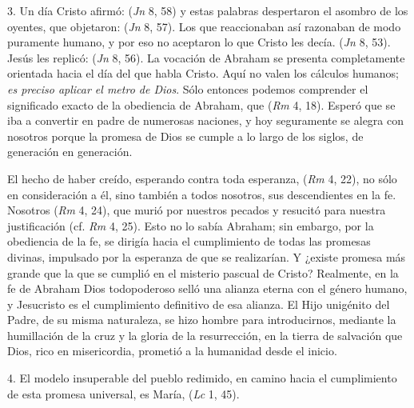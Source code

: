 \begin{body}
3. Un día Cristo afirmó:  (\textit{Jn} 8, 58) y estas palabras despertaron el asombro de los oyentes, que objetaron:  (\textit{Jn} 8, 57). Los que reaccionaban así razonaban de modo puramente humano, y por eso no aceptaron lo que Cristo les decía.  (\textit{Jn} 8, 53). Jesús les replicó:  (\textit{Jn} 8, 56). La vocación de Abraham se presenta completamente orientada hacia el día del que habla Cristo. Aquí no valen los cálculos humanos; \textit{es preciso aplicar el metro de Dios}. Sólo entonces podemos comprender el significado exacto de la obediencia de Abraham, que  (\textit{Rm} 4, 18). Esperó que se iba a convertir en padre de numerosas naciones, y hoy seguramente se alegra con nosotros porque la promesa de Dios se cumple a lo largo de los siglos, de generación en generación.

El hecho de haber creído, esperando contra toda esperanza,  (\textit{Rm} 4, 22), no sólo en consideración a él, sino también a todos nosotros, sus descendientes en la fe. Nosotros  (\textit{Rm} 4, 24), que murió por nuestros pecados y resucitó para nuestra justificación (cf. \textit{Rm} 4, 25). Esto no lo sabía Abraham; sin embargo, por la obediencia de la fe, se dirigía hacia el cumplimiento de todas las promesas divinas, impulsado por la esperanza de que se realizarían. Y ¿existe promesa más grande que la que se cumplió en el misterio pascual de Cristo? Realmente, en la fe de Abraham Dios todopoderoso selló una alianza eterna con el género humano, y Jesucristo es el cumplimiento definitivo de esa alianza. El Hijo unigénito del Padre, de su misma naturaleza, se hizo hombre para introducirnos, mediante la humillación de la cruz y la gloria de la resurrección, en la tierra de salvación que Dios, rico en misericordia, prometió a la humanidad desde el inicio.

4. El modelo insuperable del pueblo redimido, en camino hacia el cumplimiento de esta promesa universal, es María,  (\textit{Lc} 1, 45).


\end{body}
